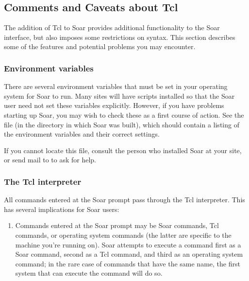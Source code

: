 {%
\subsection{Comments and Caveats about Tcl}
\label{INTERFACE-tcl}

The addition of Tcl to Soar provides additional functionality to the Soar
interface, but also imposes some restrictions on syntax. This section
describes some of the features and potential problems you may encounter.


\subsubsection*{Environment variables}

There are several environment variables that must be set in your operating
system for Soar to run. Many sites will have scripts installed so that the
Soar user need not set these variables explicitly. However, if you have
problems starting up Soar, you may wish to check these as a first course of
action. See the file  (in the directory in
which Soar was built), which should contain a listing of the environment
variables and their correct settings.


If you cannot locate this file, consult the person who installed Soar at your
site, or send mail to  to ask for help.

\subsubsection*{The Tcl interpreter}

All commands entered at the Soar prompt pass through the Tcl interpreter. This
has several implications for Soar users:\vspace{-12pt}
\begin{enumerate}
\item Commands entered at the Soar prompt may be Soar commands, Tcl commands,
	or operating system commands (the latter are specific to the machine
	you're running on). Soar attempts to execute a command first as a Soar
	command, second as a Tcl command, and third as an operating system
	command; in the rare case of commands that have the same name, the
	first system that can execute the command will do so.\vspace{-6pt}


\end{enumerate}}

